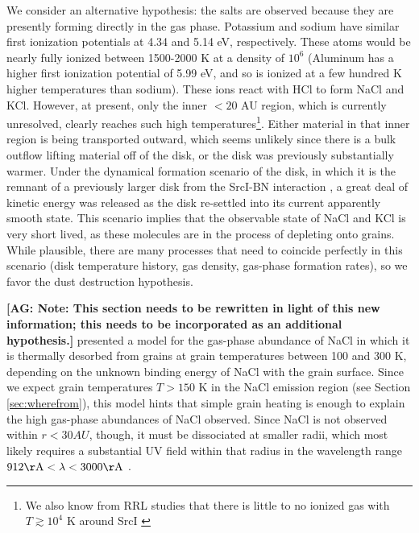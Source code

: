 \documentclass[twocolumn]{aastex62}
\newcommand{\sourcei}{SrcI\xspace}
\newcommand{\ag}[1]{\textcolor{red!65!black}{\textbf{[AG: #1]}}}
\begin{document}
We consider an alternative hypothesis: the salts are observed because they are
presently forming directly in the gas phase.  Potassium and sodium have similar
first ionization potentials at 4.34 and 5.14 eV, respectively.  These atoms
would be nearly fully ionized between 1500-2000 K at a density of $10^6$
\percc (Aluminum has a higher first ionization potential of 5.99 eV, and so is ionized
at a few hundred K higher temperatures than sodium).  These ions react with HCl
to form NaCl and KCl.  However, at present, only the inner $<20$ AU region,
which is currently unresolved, clearly reaches
such high temperatures\footnote{We also know from RRL studies
that there is little to no ionized gas with $T\gtrsim10^4$ K around \sourcei
\citep{Plambeck2016a,Baez-Rubio2018a}}.  Either material in that inner region is being
transported outward, which seems unlikely since there is a bulk outflow lifting
material off of the disk, or the disk was previously substantially warmer.
Under the dynamical formation scenario of the disk, in which it is the remnant
of a previously larger disk from the \sourcei-BN interaction
\citep{Bally2017a,Luhman2017a}, a great deal of kinetic energy was released as
the disk re-settled into its current apparently smooth state.  This scenario
implies that the observable state of NaCl and KCl is very short lived, as these
molecules are in the process of depleting onto grains.
While plausible, there are many processes that need to coincide perfectly
in this scenario (disk temperature history, gas density, gas-phase formation
rates), so we favor the dust destruction hypothesis.


\ag{Note: This section needs to be rewritten in light of this new information;
this needs to be incorporated as an additional hypothesis.}
\citet{Decin2016a} presented a model for the gas-phase abundance of
NaCl in which it is thermally desorbed from grains at grain temperatures
between 100 and 300 K, depending on the unknown binding energy of NaCl with
the grain surface.  Since we expect grain temperatures $T>150$ K in the
NaCl emission region (see Section \ref{sec:wherefrom}), this model hints
that simple grain heating is enough to explain the high gas-phase abundances
of NaCl observed.  Since NaCl is not observed within $r<30 AU$, though,
it must be dissociated at smaller radii, which most likely requires
a substantial UV field within that radius in the wavelength range
$912 \mathrm{\AA} < \lambda < 3000 \mathrm{\AA}$ \citep{Silver1986a}.

\end{document}
